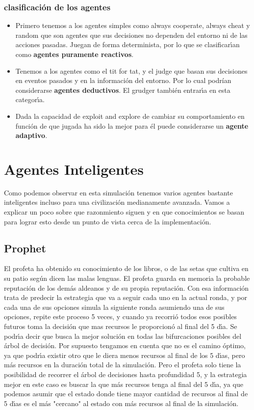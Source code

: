 \documentclass{article}
\begin{document}
\subsubsection{clasificaci\'on de los agentes}
\begin{itemize}
      \item Primero tenemos a los agentes simples como always cooperate, always cheat y random que son agentes que sus decisiones no dependen del entorno
            ni de las acciones pasadas. Juegan de forma determinista, por lo que se clasificar\'{\i}an como \textbf{agentes puramente reactivos}.
      \item Tenemos a los agentes como el tit for tat, y el judge que basan sus decisiones en eventos pasados y en la informaci\'on del entorno. Por lo cual podr\'ian
            considerarse \textbf{agentes deductivos}. El grudger tambi\'en entrar\'{\i}a en esta categor\'{\i}a.
      \item Dada la capacidad de exploit and explore de cambiar su comportamiento en funci\'on de que jugada ha sido la mejor para \'el puede considerarse un
            \textbf{agente adaptivo}.
\end{itemize}
\newpage

\section{Agentes Inteligentes}
Como podemos observar en esta simulaci\'on tenemos varios agentes bastante inteligentes incluso para una civilizaci\'on medianamente avanzada. Vamos a explicar
un poco sobre que razonmiento siguen y en que conocimientos se basan para lograr esto desde un punto de vista cerca de la implementaci\'on.

\subsection{Prophet}
El profeta ha obtenido su conocimiento de los libros, o de las setas que cultiva en su patio seg\'un dicen las malas lenguas. El profeta guarda en memoria la
probable reputaci\'on de los dem\'as aldeanos y de su propia reputaci\'on. Con esa informaci\'on trata de predecir la estrategia que va a seguir cada uno en la actual
ronda, y por cada una de sus opciones simula la siguiente ronda asumiendo una de sus opciones, repite este proceso 5 veces, y cuando ya recorri\'o todos esos posibles
futuros toma la decisi\'on que mas recursos le proporcion\'o al final del 5 d\'{\i}a. Se podr\'{\i}a decir que busca la mejor soluci\'on en todas las bifurcaciones posibles del \'arbol de
decisi\'on. Por supuesto tengamos en cuenta que no es el camino \'optimo, ya que podr\'{\i}a existir otro que le diera menos recursos al final de los 5 d\'{\i}as, pero
m\'as recursos en la duraci\'on total de la simulaci\'on. Pero el profeta solo tiene la posibilidad de recorrer el \'arbol de decisiones hasta profundidad 5, y la estrategia
mejor en este caso es buscar la que m\'as recursos tenga al final del 5 d\'{\i}a, ya que podemos asumir que el estado donde tiene mayor cantidad de recursos al final de
5 d\'{\i}as es el m\'as "cercano" al estado con m\'as recursos al final de la simulaci\'on.
\end{document}
